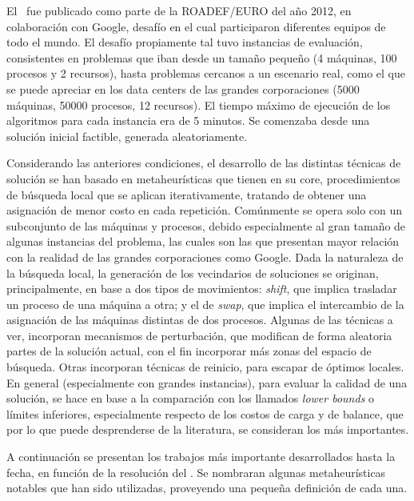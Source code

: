 \documentclass[../informe2.tex]{subfiles}
\begin{document}
El \mrp\ fue publicado como parte de la ROADEF/EURO del año 2012, en colaboración con Google, desafío en el cual participaron diferentes equipos de todo el mundo. El desafío propiamente tal tuvo instancias de evaluación, consistentes en problemas que iban desde un tamaño pequeño (4 máquinas, 100 procesos y 2 recursos), hasta problemas cercanos a un escenario real, como el que se puede apreciar en los data centers de las grandes corporaciones (5000 máquinas, 50000 procesos, 12 recursos). El tiempo máximo de ejecución de los algoritmos para cada instancia era de 5 minutos. Se comenzaba desde una solución inicial factible, generada aleatoriamente. \par
\noindent Considerando las anteriores condiciones, el desarrollo de las distintas técnicas de solución se han basado en metaheurísticas que tienen en su core, procedimientos de búsqueda local que se aplican iterativamente, tratando de obtener una asignación de menor costo en cada repetición. Comúnmente se opera solo con un subconjunto de las máquinas y procesos, debido especialmente al gran tamaño de algunas instancias del problema, las cuales son las que presentan mayor relación con la realidad de las grandes corporaciones como Google. Dada la naturaleza de la búsqueda local, la generación de los vecindarios de soluciones se originan, principalmente, en base a dos tipos de movimientos: \textit{shift}, que implica trasladar un proceso de una máquina a otra; y el de \textit{swap}, que implica el intercambio de la asignación de las máquinas distintas de dos procesos. Algunas de las técnicas a ver, incorporan mecanismos de perturbación, que modifican de forma aleatoria partes de la solución actual, con el fin incorporar más zonas del espacio de búsqueda. Otras incorporan técnicas de reinicio, para escapar de óptimos locales. En general (especialmente con grandes instancias), para evaluar la calidad de una solución, se hace en base a la comparación con los llamados \textit{lower bounds} o límites inferiores, especialmente respecto de los costos de carga y de balance, que por lo que puede desprenderse de la literatura, se consideran los más importantes. \par
\noindent A continuación se presentan los trabajos más importante desarrollados hasta la fecha, en función de la resolución del \mrp. Se nombraran algunas metaheurísticas notables que han sido utilizadas, proveyendo una pequeña definición de cada una.
\end{document}
